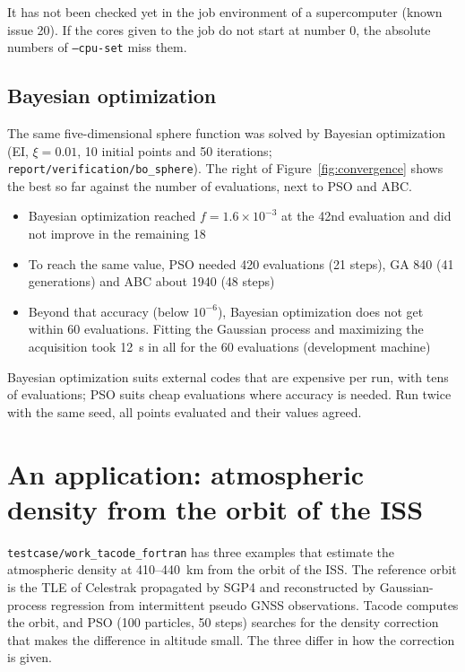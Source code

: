 \documentclass[11pt,a4paper]{article}
\begin{document}
It has not been checked yet in the job environment of a supercomputer (known issue 20). If the cores given to the job do not start at number 0, the absolute numbers of \texttt{--cpu-set} miss them.

\subsection{Bayesian optimization}\label{sec:val-bo}

The same five-dimensional sphere function was solved by Bayesian optimization (EI, $\xi = 0.01$, 10 initial points and 50 iterations; \texttt{report/verification/bo\_sphere}). The right of Figure~\ref{fig:convergence} shows the best so far against the number of evaluations, next to PSO and ABC.

\begin{itemize}
\item Bayesian optimization reached $f = 1.6 \times 10^{-3}$ at the 42nd evaluation and did not improve in the remaining 18
\item To reach the same value, PSO needed 420 evaluations (21 steps), GA 840 (41 generations) and ABC about 1940 (48 steps)
\item Beyond that accuracy (below $10^{-6}$), Bayesian optimization does not get within 60 evaluations. Fitting the Gaussian process and maximizing the acquisition took 12~s in all for the 60 evaluations (development machine)
\end{itemize}

Bayesian optimization suits external codes that are expensive per run, with tens of evaluations; PSO suits cheap evaluations where accuracy is needed. Run twice with the same seed, all points evaluated and their values agreed.

\section{An application: atmospheric density from the orbit of the ISS}\label{sec:application}

\texttt{testcase/work\_tacode\_fortran} has three examples that estimate the atmospheric density at 410--440~km from the orbit of the ISS. The reference orbit is the TLE of Celestrak propagated by SGP4 and reconstructed by Gaussian-process regression from intermittent pseudo GNSS observations. Tacode computes the orbit, and PSO (100 particles, 50 steps) searches for the density correction that makes the difference in altitude small. The three differ in how the correction is given.
\end{document}
